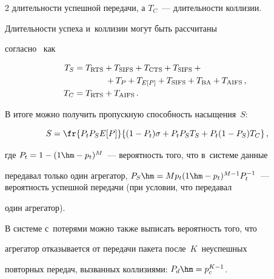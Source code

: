 \begin{multicols}{2}
длительности успешной передачи, а $T_C$~--- длительности коллизии. 


Длительности успеха и~коллизии могут быть рассчитаны 


согласно~\cite{7-om} как


    \begin{align*}


       \hspace*{-2mm}T_S &= T_{\mathrm{RTS}}+ T_{\mathrm{SIFS}}+ T_{\mathrm{CTS}}+ T_{\mathrm{SIFS}} +{}       \hspace*{2mm}\\


    &\hspace*{13mm}{}+T_P+ T_{E[P]}  +T_{\mathrm{SIFS}} +T_{\mathrm{BA}}+T_{\mathrm{AIFS}}\,,       \\


          \hspace*{-2mm} T_C &= T_{\mathrm{RTS}} +T_{\mathrm{AIFS}}\,.       \hspace*{2mm}




    \end{align*}


    


    В итоге можно получить пропускную способность насыщения~$S$:


    \begin{equation*}


    S= \fr{P_t P_S E[P]}{(1-P_t)\sigma +P_t P_S T_S +P_t(1-P_S) T_C}\,,




    \end{equation*}


где $P_t= 1-(1\hm- p_t)^M$~--- вероятность того, что в~системе данные 


передавал только один агрегатор, $P_S\hm= Mp_t(1\hm- p_t)^{M-1}P_t^{-


1}$~--- вероятность успешной передачи (при условии, что передавал 


один агрегатор). 





    В системе с~потерями можно также выписать вероятность того, что 


агрегатор отказывается от передачи пакета после~$K$~неуспешных 


повторных передач, вызванных коллизиями: $P_d\hm= p_c^{K-1}$.






\end{multicols}
